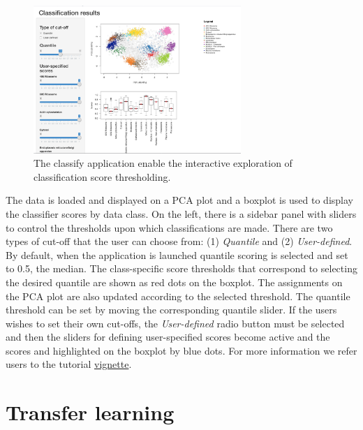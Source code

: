 \begin{figure}[!ht]
  \centering
  \includegraphics[width=0.7\textwidth]{./Figures/classify.png}
  \caption{The classify application enable the interactive exploration
    of classification score thresholding.}
  \label{fig:classifyapp}
\end{figure}

\pagebreak

The data is loaded and displayed on a PCA plot and a boxplot is used
to display the classifier scores by data class. On the left, there is
a sidebar panel with sliders to control the thresholds upon which
classifications are made. There are two types of cut-off that the user
can choose from: (1) \textit{Quantile} and (2)
\textit{User-defined}. By default, when the application is launched
quantile scoring is selected and set to 0.5, the median. The
class-specific score thresholds that correspond to selecting the
desired quantile are shown as red dots on the boxplot. The assignments
on the PCA plot are also updated according to the selected
threshold. The quantile threshold can be set by moving the
corresponding quantile slider. If the users wishes to set their own
cut-offs, the \textit{User-defined} radio button must be selected and
then the sliders for defining user-specified scores become active and
the scores and highlighted on the boxplot by blue dots. For more
information we refer users to the  tutorial
\href{http://bioconductor.org/packages/release/bioc/vignettes/pRolocGUI/inst/doc/pRolocGUI.html}{vignette}.

\clearpage

\section*{Transfer learning}

